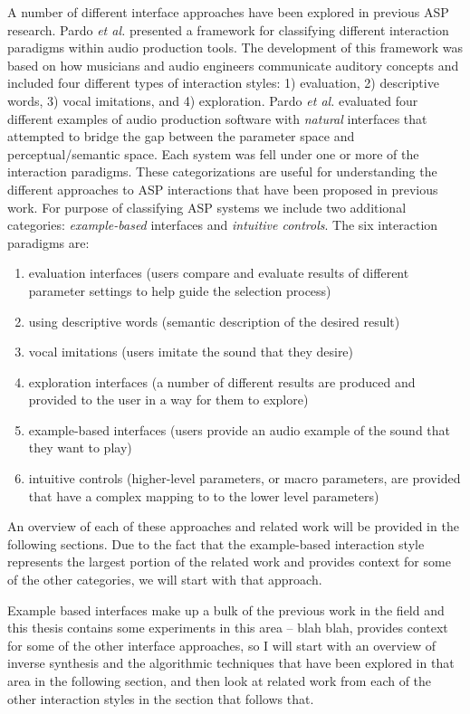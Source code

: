 A number of different interface approaches have been explored in previous ASP research. Pardo \textit{et al.} \cite{pardo2019learning} presented a framework for classifying different interaction paradigms within audio production tools. The development of this framework was based on how musicians and audio engineers communicate auditory concepts and included four different types of interaction styles: 1) evaluation, 2) descriptive words, 3) vocal imitations, and 4) exploration. Pardo \textit{et al.} evaluated four different examples of audio production software with \textit{natural} interfaces that attempted to bridge the gap between the parameter space and perceptual/semantic space. Each system was fell under one or more of the interaction paradigms. These categorizations are useful for understanding the different approaches to ASP interactions that have been proposed in previous work. For purpose of classifying ASP systems we include two additional categories: \textit{example-based} interfaces and \textit{intuitive controls}. The six interaction paradigms are:

\begin{enumerate}
    \item evaluation interfaces (users compare and evaluate results of different parameter settings to help guide the selection process)
    \item using descriptive words (semantic description of the desired result)
    \item vocal imitations (users imitate the sound that they desire)
    \item exploration interfaces (a number of different results are produced and provided to the user in a way for them to explore)
    \item example-based interfaces (users provide an audio example of the sound that they want to play)
    \item intuitive controls (higher-level parameters, or macro parameters, are provided that have a complex mapping to to the lower level parameters)
\end{enumerate}

An overview of each of these approaches and related work will be provided in the following sections. Due to the fact that the example-based interaction style represents the largest portion of the related work and provides context for some of the other categories, we will start with that approach.

Example based interfaces make up a bulk of the previous work in the field and this thesis contains some experiments in this area -- blah blah, provides context for some of the other interface approaches, so I will start with an overview of inverse synthesis and the algorithmic techniques that have been explored in that area in the following section, and then look at related work from each of the other interaction styles in the section that follows that.

